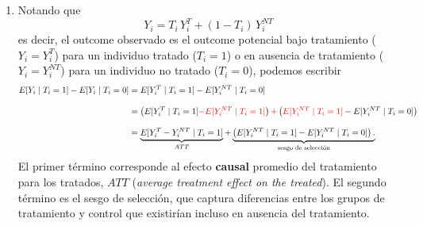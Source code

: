 \documentclass[10pt,a4paper]{article}
\begin{document}
\begin{enumerate}
{\begin{enumerate}
            \item Notando que
                $$
                    Y_i
                    =
                    T_i
                    \,
                    Y_i^{T}
                    +
                    \left(
                        1
                        -
                        T_i
                    \right)
                    \,
                    Y_i^{NT}
                $$
                es decir, el outcome observado es el outcome potencial bajo tratamiento ($Y_i = Y_i^T$) para un individuo tratado ($T_i = 1$) o en ausencia de tratamiento ($Y_i = Y_i^{NT}$) para un individuo no tratado ($T_i = 0$), podemos escribir
                \begin{align*}
                    E[Y_i\mid T_i=1]
                    -
                    E[Y_i\mid T_i=0]
                    &=
                    E[Y_i^T \mid T_i = 1]
                    -
                    E[Y_i^{NT} \mid T_i = 0]
                    \\[2ex]
                    &=
                    \left(
                        E[Y_i^T \mid T_i = 1]
                        {
                            \color{red}
                            -
                            E[Y_i^{NT} \mid T_i = 1]
                        }
                    \right)
                    \textcolor{red}{+}
                    \left(
                        \textcolor{red}{E[Y_i^{NT} \mid T_i = 1]}
                        -
                        E[Y_i^{NT} \mid T_i = 0]
                    \right)
                    \\[2ex]
                    &=
                    \underbrace{
                        E[
                            Y_i^T
                            -
                            Y_i^{NT} 
                            \mid 
                            T_i 
                            = 
                            1
                        ]
                    }_{ATT}
                    +
                    \underbrace{
                        \left(
                            E[Y_i^{NT} \mid T_i = 1]
                            -
                            E[Y_i^{NT} \mid T_i = 0]
                        \right)
                        \text{.}
                    }_{\text{sesgo de selección}}
                \end{align*}
                El primer término corresponde al efecto \textbf{causal} promedio del tratamiento para los tratados, $ATT$ (\textit{average treatment effect on the treated}).
                El segundo término es el sesgo de selección, que captura diferencias entre los grupos de tratamiento y control que existirían incluso en ausencia del tratamiento.
                

\end{enumerate}}
\end{enumerate}
\end{document}
